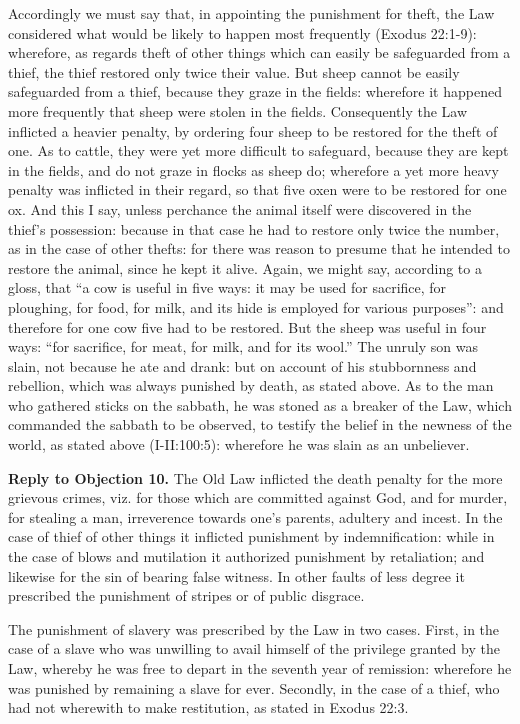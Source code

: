 Accordingly we must say that, in appointing the punishment for theft, the Law considered what would be likely to happen most frequently (Exodus 22:1-9): wherefore, as regards theft of other things which can easily be safeguarded from a thief, the thief restored only twice their value. But sheep cannot be easily safeguarded from a thief, because they graze in the fields: wherefore it happened more frequently that sheep were stolen in the fields. Consequently the Law inflicted a heavier penalty, by ordering four sheep to be restored for the theft of one. As to cattle, they were yet more difficult to safeguard, because they are kept in the fields, and do not graze in flocks as sheep do; wherefore a yet more heavy penalty was inflicted in their regard, so that five oxen were to be restored for one ox. And this I say, unless perchance the animal itself were discovered in the thief's possession: because in that case he had to restore only twice the number, as in the case of other thefts: for there was reason to presume that he intended to restore the animal, since he kept it alive. Again, we might say, according to a gloss, that ``a cow is useful in five ways: it may be used for sacrifice, for ploughing, for food, for milk, and its hide is employed for various purposes'': and therefore for one cow five had to be restored. But the sheep was useful in four ways: ``for sacrifice, for meat, for milk, and for its wool.'' The unruly son was slain, not because he ate and drank: but on account of his stubbornness and rebellion, which was always punished by death, as stated above. As to the man who gathered sticks on the sabbath, he was stoned as a breaker of the Law, which commanded the sabbath to be observed, to testify the belief in the newness of the world, as stated above (I-II:100:5): wherefore he was slain as an unbeliever.

\textbf{Reply to Objection 10.} The Old Law inflicted the death penalty for the more grievous crimes, viz. for those which are committed against God, and for murder, for stealing a man, irreverence towards one's parents, adultery and incest. In the case of thief of other things it inflicted punishment by indemnification: while in the case of blows and mutilation it authorized punishment by retaliation; and likewise for the sin of bearing false witness. In other faults of less degree it prescribed the punishment of stripes or of public disgrace.

The punishment of slavery was prescribed by the Law in two cases. First, in the case of a slave who was unwilling to avail himself of the privilege granted by the Law, whereby he was free to depart in the seventh year of remission: wherefore he was punished by remaining a slave for ever. Secondly, in the case of a thief, who had not wherewith to make restitution, as stated in Exodus 22:3.

